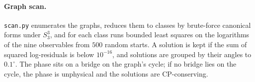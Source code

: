 \documentclass[submission, Phys]{SciPost}
\begin{document}
\begin{appendix}
\paragraph{Graph scan.} \texttt{scan.py} enumerates the graphs, reduces
them to classes by brute-force canonical forms under
$S_3^3$, and for each class runs bounded least squares on the
logarithms of the nine observables from $500$ random starts. A
solution is kept if the sum of squared log-residuals is below
$10^{-16}$, and solutions are grouped by their angles to $0.1^\circ$. The
phase sits on a bridge on the graph's cycle; if no bridge lies on the
cycle, the phase is unphysical and the solutions are CP-conserving.

\end{appendix}



\nolinenumbers
\end{document}
